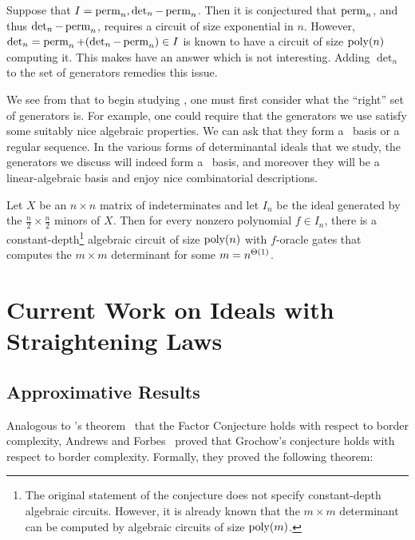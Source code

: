 \documentclass[letterpaper, 11pt]{amsart}
\begin{document}
\begin{ex}\label{ex:det_perm_ideal}
  Suppose that $I = \ideal{\perm_n, \det_n - \perm_n}$.
  Then it is conjectured that $\operatorname{perm}_n$, and thus $\det_n - \operatorname{perm}_n$, requires a circuit of size exponential in $n$.
  However, $\det_n = \operatorname{perm}_n + (\det_n - \operatorname{perm}_n) \in I$ is known to have a circuit of size $\operatorname{poly}(n)$ computing it.
  This makes  have an answer which is not interesting.
  Adding $\det_n$ to the set of generators remedies this issue.
\end{ex}

We see from  that to begin studying , one must first consider what the ``right'' set of generators is.
For example, one could require that the generators we use satisfy some suitably nice algebraic properties.
We can ask that they form a \Grobner\ basis or a regular sequence.
In the various forms of determinantal ideals that we study, the generators we discuss will indeed form a \Grobner\ basis, and moreover they will be a linear-algebraic basis and enjoy nice combinatorial descriptions.

\begin{conj}\label{conj:grochow_det}
  Let $X$ be an $n \times n$ matrix of indeterminates and let $I_n$ be the ideal generated by the $\tfrac{n}{2} \times \tfrac{n}{2}$ minors of $X$.
  Then for every nonzero polynomial $f \in I_n$, there is a constant-depth\footnote{The original statement of the conjecture does not specify constant-depth algebraic circuits. However, it is already known that the $m \times m$ determinant can be computed by algebraic circuits of size $\operatorname{poly}(m)$.} algebraic circuit of size $\operatorname{poly}(n)$ with $f$-oracle gates that computes the $m \times m$ determinant for some $m = n^{\Theta\kern-0.0pt\left(1\right)}$.
\end{conj}

\section{Current Work on Ideals with Straightening Laws}


\subsection{Approximative Results}

Analogous to \Burgisser's theorem~\cite{Bur04} that the Factor Conjecture holds with respect to border complexity, Andrews and Forbes~\cite{AF22} proved that Grochow's conjecture holds with respect to border complexity.
Formally, they proved the following theorem:
\end{document}

